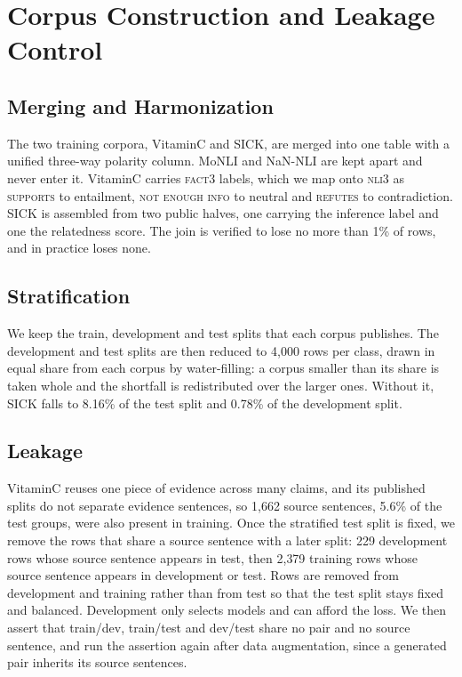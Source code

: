 \documentclass[11pt]{article}
\begin{document}


\appendix

\section{Corpus Construction and Leakage Control}
\label{an:corpus}

\subsection{Merging and Harmonization}

The two training corpora, VitaminC and SICK, are merged into one table with a unified three-way polarity column. MoNLI and NaN-NLI are kept apart and never enter it.
VitaminC carries \textsc{fact3} labels, which we map onto \textsc{nli3} as \textsc{supports} to entailment, \textsc{not enough info} to neutral and \textsc{refutes} to contradiction.
SICK is assembled from two public halves, one carrying the inference label and one the relatedness score. The join is verified to lose no more than 1\% of rows, and in practice loses none.

\subsection{Stratification}

We keep the train, development and test splits that each corpus publishes. The development and test splits are then reduced to 4{,}000 rows per class, drawn in equal share from each corpus by water-filling: a corpus smaller than its share is taken whole and the shortfall is redistributed over the larger ones.
Without it, SICK falls to 8.16\% of the test split and 0.78\% of the development split.

\subsection{Leakage}

VitaminC reuses one piece of evidence across many claims, and its published splits do not separate evidence sentences, so 1{,}662 source sentences, 5.6\% of the test groups, were also present in training.
Once the stratified test split is fixed, we remove the rows that share a source sentence with a later split: 229 development rows whose source sentence appears in test, then 2{,}379 training rows whose source sentence appears in development or test.
Rows are removed from development and training rather than from test so that the test split stays fixed and balanced. Development only selects models and can afford the loss.
We then assert that train/dev, train/test and dev/test share no pair and no source sentence, and run the assertion again after data augmentation, since a generated pair inherits its source sentences.
\end{document}
